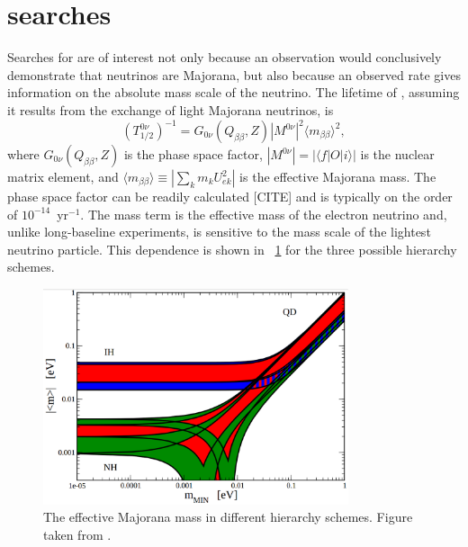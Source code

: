\section{\zvbb searches}

Searches for \zvbb are of interest not only because an observation would conclusively demonstrate that neutrinos are Majorana, but also because an observed rate gives information on the absolute mass scale of the neutrino.  The lifetime of \zvbb, assuming it results from the exchange of light Majorana neutrinos, is 
\begin{equation}
(T^{0\nu}_{1/2})^{-1} = G_{0\nu}(Q_{\beta\beta},Z)|M^{0\nu}|^2 {\langle}m_{\beta\beta}{\rangle}^2,
\end{equation}
where $G_{0\nu}(Q_{\beta\beta},Z)$ is the phase space factor, $|M^{0\nu}| = |{\langle}f|O|i{\rangle}|$ is the nuclear matrix element, and $\displaystyle {\langle}m_{\beta\beta}{\rangle} \equiv |\sum_{k}m_k U_{ek}^2|$ is the effective Majorana mass.  The phase space factor can be readily calculated [CITE] and is typically on the order of $10^{-14}$~yr$^{-1}$.  The mass term is the effective mass of the electron neutrino and, unlike long-baseline experiments, is sensitive to the mass scale of the lightest neutrino particle.  This dependence is shown in {\fig}~\ref{fig:effectiveMajoranaMass} for the three possible hierarchy schemes.  
\begin{figure}[htp]
\centering
\includegraphics[width=0.8\textwidth]{figures/effectiveMajoranaMass.eps}
\caption{The effective Majorana mass in different hierarchy schemes.  Figure taken from \cite{PDG}.}
\label{fig:effectiveMajoranaMass}
\end{figure}

